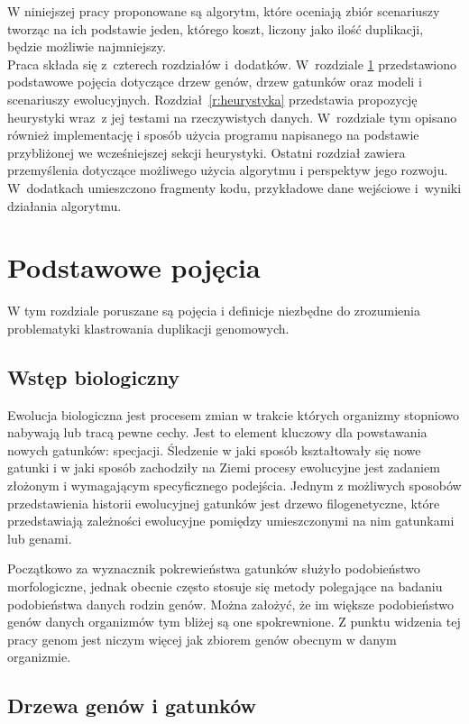\documentclass[licencjacka]{pracamgr}
\begin{document}
W niniejszej pracy proponowane są algorytm, które oceniają zbiór scenariuszy tworząc na ich podstawie jeden, którego koszt, liczony jako ilość duplikacji, będzie możliwie najmniejszy.
\\
Praca składa się z~czterech rozdziałów i~dodatków.
W~rozdziale \ref{r:pojecia} przedstawiono podstawowe pojęcia dotyczące drzew genów, drzew gatunków oraz modeli i scenariuszy ewolucyjnych.  
Rozdział~\ref{r:heurystyka} przedstawia propozycję heurystyki wraz~z jej testami na rzeczywistych danych.  W~rozdziale tym opisano również implementację i sposób użycia programu napisanego na podstawie przybliżonej we wcześniejszej sekcji heurystyki.
Ostatni rozdział zawiera przemyślenia dotyczące możliwego użycia algorytmu i perspektyw jego rozwoju. W~dodatkach umieszczono fragmenty kodu, przykładowe dane wejściowe i~wyniki działania algorytmu.

\chapter{Podstawowe pojęcia}\label{r:pojecia}

W tym rozdziale poruszane są pojęcia i definicje niezbędne do zrozumienia problematyki klastrowania duplikacji genomowych. 
\section{Wstęp biologiczny}

Ewolucja biologiczna jest procesem zmian w trakcie których organizmy stopniowo nabywają lub tracą pewne cechy. Jest to element kluczowy dla powstawania nowych gatunków: specjacji. Śledzenie w jaki sposób kształtowały się nowe gatunki i w jaki sposób zachodziły na Ziemi procesy ewolucyjne jest zadaniem złożonym i wymagającym specyficznego podejścia. Jednym z możliwych sposobów przedstawienia historii ewolucyjnej gatunków jest drzewo filogenetyczne, które przedstawiają zależności ewolucyjne pomiędzy umieszczonymi na nim gatunkami lub genami. 

Początkowo za wyznacznik pokrewieństwa gatunków służyło podobieństwo morfologiczne, jednak obecnie często stosuje się metody polegające na badaniu podobieństwa danych rodzin genów. Można założyć, że im większe podobieństwo genów danych organizmów tym bliżej są one spokrewnione. Z punktu widzenia tej pracy genom jest niczym więcej jak zbiorem genów obecnym w danym organizmie. 


\section{Drzewa genów i gatunków}
\end{document}
